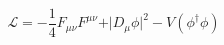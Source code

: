 \begin{equation} {\mathcal L}= -\frac{1}{4} F_{\mu
\nu}F^{\mu \nu}+ \vert D_\mu \phi\vert^2 -V(\phi^\dagger \phi)
\end{equation}

